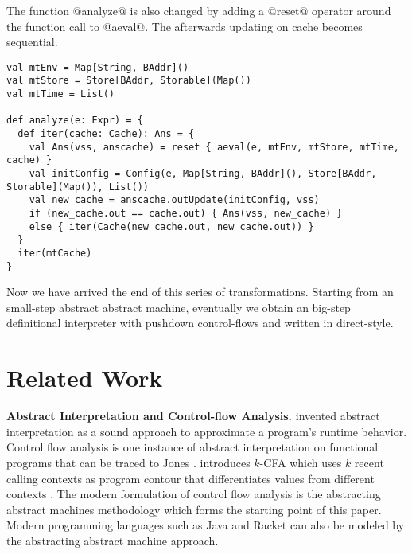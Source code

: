 \documentclass[acmsmall]{acmart}\settopmatter{}
\begin{document}
The function @analyze@ is also changed by adding a @reset@ operator around the function call to @aeval@.
The afterwards updating on cache becomes sequential.

\begin{lstlisting}
val mtEnv = Map[String, BAddr]()
val mtStore = Store[BAddr, Storable](Map())
val mtTime = List()

def analyze(e: Expr) = {
  def iter(cache: Cache): Ans = {
    val Ans(vss, anscache) = reset { aeval(e, mtEnv, mtStore, mtTime, cache) }
    val initConfig = Config(e, Map[String, BAddr](), Store[BAddr, Storable](Map()), List())
    val new_cache = anscache.outUpdate(initConfig, vss)
    if (new_cache.out == cache.out) { Ans(vss, new_cache) }
    else { iter(Cache(new_cache.out, new_cache.out)) }
  }
  iter(mtCache)
}
\end{lstlisting}

Now we have arrived the end of this series of transformations. Starting from an small-step abstract abstract machine, 
eventually we obtain an big-step definitional interpreter with pushdown control-flows and written in direct-style.


\section{Related Work}\label{sec:related}

\textbf{Abstract Interpretation and Control-flow Analysis.}
\citeauthor{cousot1977abstract} invented abstract interpretation as a sound approach
to approximate a program's runtime behavior\cite{cousot1977abstract}.
Control flow analysis is one instance of abstract interpretation on functional programs
that can be traced to Jones \cite{jones1981flow}.
\citeauthor{Shivers:1988:CFA:53990.54007} introduces $k$-CFA which uses $k$ recent calling contexts as program contour that differentiates values from different contexts \cite{Shivers:1988:CFA:53990.54007, Shivers:1991:SSC:115865.115884}.
The modern formulation of control flow analysis is the abstracting abstract machines
methodology \cite{van2012systematic, van2010abstracting} which forms the starting point of this paper.
Modern programming languages such as Java\cite{might2010resolving} and Racket \cite{Tobin-Hochstadt:2012:HSE:2384616.2384655}
can also be modeled by the abstracting abstract machine approach.
\end{document}
